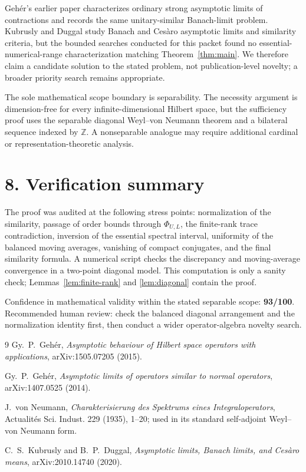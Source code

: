 \documentclass[11pt]{article}
\newcommand{\PhiUL}{\Phi_{U,L}}
\begin{document}
Geh\'er's earlier paper \cite{GeherPaper} characterizes ordinary strong asymptotic limits of contractions and records the same unitary-similar Banach-limit problem.  Kubrusly and Duggal \cite{KD} study Banach and Ces\`aro asymptotic limits and similarity criteria, but the bounded searches conducted for this packet found no essential-numerical-range characterization matching Theorem~\ref{thm:main}.  We therefore claim a candidate solution to the stated problem, not publication-level novelty; a broader priority search remains appropriate.

The sole mathematical scope boundary is separability.  The necessity argument is dimension-free for every infinite-dimensional Hilbert space, but the sufficiency proof uses the separable diagonal Weyl--von Neumann theorem and a bilateral sequence indexed by $\mathbb Z$.  A nonseparable analogue may require additional cardinal or representation-theoretic analysis.

\section*{8. Verification summary}

The proof was audited at the following stress points: normalization of the similarity, passage of order bounds through $\PhiUL$, the finite-rank trace contradiction, inversion of the essential spectral interval, uniformity of the balanced moving averages, vanishing of compact conjugates, and the final similarity formula.  A numerical script checks the discrepancy and moving-average convergence in a two-point diagonal model.  This computation is only a sanity check; Lemmas~\ref{lem:finite-rank} and \ref{lem:diagonal} contain the proof.

Confidence in mathematical validity within the stated separable scope: \textbf{93/100}.  Recommended human review: check the balanced diagonal arrangement and the normalization identity first, then conduct a wider operator-algebra novelty search.

\begin{thebibliography}{9}
Gy.~P.~Geh\'er,
\emph{Asymptotic behaviour of Hilbert space operators with applications},
arXiv:1505.07205 (2015).

Gy.~P.~Geh\'er,
\emph{Asymptotic limits of operators similar to normal operators},
arXiv:1407.0525 (2014).

J.~von Neumann,
\emph{Charakterisierung des Spektrums eines Integraloperators},
Actualit\'es Sci. Indust. 229 (1935), 1--20;
used in its standard self-adjoint Weyl--von Neumann form.

C.~S.~Kubrusly and B.~P.~Duggal,
\emph{Asymptotic limits, Banach limits, and Ces\`aro means},
arXiv:2010.14740 (2020).
\end{thebibliography}
\end{document}
